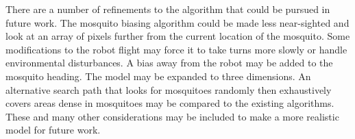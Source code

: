 \documentclass[letterpaper, 10 pt, conference]{ieeeconf}  %
\newcommand{\todo}[1]{\vspace{5 mm}\par \noindent \framebox{\begin{minipage}[c]{0.98 \columnwidth} \ttfamily\flushleft \textcolor{red}{#1}\end{minipage}}\vspace{5 mm}\par}
\begin{document}
\todo{add any conclusions from the hardware aspect}

There are a number of refinements to the algorithm that could be pursued in future work.  The mosquito biasing algorithm could be made less near-sighted and look at an array of pixels further from the current location of the mosquito.  Some modifications to the robot flight may force it to take turns more slowly or handle environmental disturbances.  A bias away from the robot may be added to the mosquito heading.  The model may be expanded to three dimensions.  An alternative search path that looks for mosquitoes randomly then exhaustively covers areas dense in mosquitoes may be compared to the existing algorithms.  These and many other considerations may be included to make a more realistic model for future work.

















%

%
%
%
%
%
%
\end{document}
